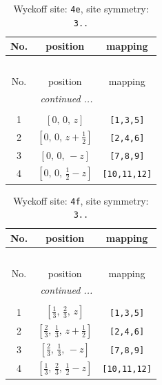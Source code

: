 \documentclass[fleqn,8pt]{jsarticle}
\begin{document}
\begin{longtable}{ccc}
\caption{Wyckoff site: {\tt 4e}, site symmetry: {\tt 3..}}
 \\
 \hline \hline
No. & position & mapping \\ \hline \endfirsthead

\multicolumn{2}{l}{\tablename\ \thetable{}} \\
 \hline \hline
No. & position & mapping \\ \hline \endhead

 \hline \hline
\multicolumn{2}{r}{\footnotesize\it continued ...} \\ \endfoot

 \hline \hline
\multicolumn{2}{r}{} \\ \endlastfoot

1 & $\left[ 0,\, 0,\, z \right]$ & {\tt [1,3,5]} \\ \hline
2 & $\left[ 0,\, 0,\, z + \frac{1}{2} \right]$ & {\tt [2,4,6]} \\ \hline
3 & $\left[ 0,\, 0,\, - z \right]$ & {\tt [7,8,9]} \\ \hline
4 & $\left[ 0,\, 0,\, \frac{1}{2} - z \right]$ & {\tt [10,11,12]} \\
\end{longtable}
\renewcommand{\arraystretch}{1.2}
\begin{longtable}{ccc}
\caption{Wyckoff site: {\tt 4f}, site symmetry: {\tt 3..}}
 \\
 \hline \hline
No. & position & mapping \\ \hline \endfirsthead

\multicolumn{2}{l}{\tablename\ \thetable{}} \\
 \hline \hline
No. & position & mapping \\ \hline \endhead

 \hline \hline
\multicolumn{2}{r}{\footnotesize\it continued ...} \\ \endfoot

 \hline \hline
\multicolumn{2}{r}{} \\ \endlastfoot

1 & $\left[ \frac{1}{3},\, \frac{2}{3},\, z \right]$ & {\tt [1,3,5]} \\ \hline
2 & $\left[ \frac{2}{3},\, \frac{1}{3},\, z + \frac{1}{2} \right]$ & {\tt [2,4,6]} \\ \hline
3 & $\left[ \frac{2}{3},\, \frac{1}{3},\, - z \right]$ & {\tt [7,8,9]} \\ \hline
4 & $\left[ \frac{1}{3},\, \frac{2}{3},\, \frac{1}{2} - z \right]$ & {\tt [10,11,12]} \\
\end{longtable}
\end{document}
